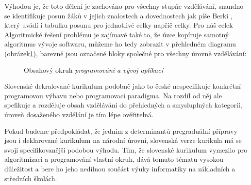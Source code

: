 \documentclass[FP,DP]{tulthesis}
\begin{document}
{{{{{{{\begin{table}[t]
\end{table}
Výhodou je, že toto dělení je zachováno pro všechny stupňe vzdělávání, snandno se identifikuje posun žáků v jejich znalostech a dovednostech jak píše Berki \citeyearpar[s.~85]{berki2016}, který uvádí i tabulku posunu pro jednotlivé celky napříč celky. Pro náš celek Algoritmické řešení problému je zajímavé také to, že úzce kopíruje samotný algoritmus vývoje softwaru, můžeme ho tedy zobrazit v přehledném diagramu (obrázek\ref{picture1}), barevně jsou označené bloky společné pro všechny úrovně vzdělávání: 

\begin{figure}[h!]

\caption{Obsahový okruh \textit {programování a vývoj aplikací}} \label{picture1}
\end{figure}

Slovenské dekralované kurikulum podobně jako to české nespecifikuje konkrétní programovou výbavu nebo programovací paradigma. Na rozdíl od něj ale spefikuje a rozděluje obsah vzdělávání do přehledných a smysluplných kategorií, úroveň dosaženého vzdělání je tím lépe ověřitelná.
 
Pokud budeme předpokládat, že jedním z determinantů pregraduální přípravy jsou i deklarované kurikulum na národní úrovni, slovenská verze kurikula má se svoji specifikovanější podobou výhodu. Tím, že slovenské kurikulum vymezilo pro algoritmizaci a programování vlastní okruh, dává tomuto tématu vysokou důležitost a bere ho jeho nedílnou součást výuky informatiky na základních a středních školách. 
}}}}}}}
\end{document}
